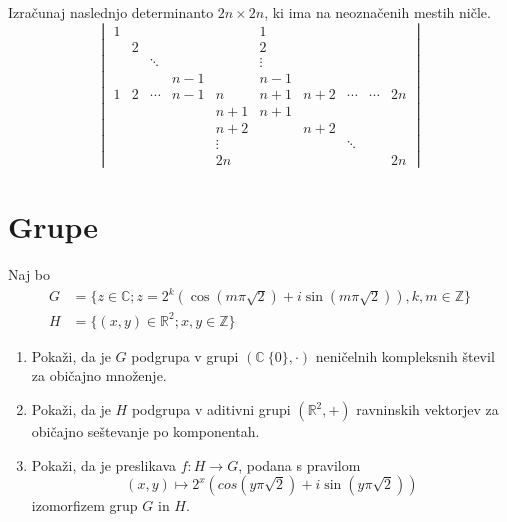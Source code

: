 \documentclass[a4paper,12pt]{article}
\begin{document}
Izračunaj naslednjo determinanto \(2n \times 2n\), ki ima na neoznačenih mestih ničle.
\[
\begin{vmatrix}
1 &   &        &     &     & 1   &     &     &        &    \\
  & 2 &        &     &     & 2   &     &     &        &    \\
  &   & \ddots &     &     & \vdots &  &     &        &    \\
  &   &        & n-1 &     & n-1 &     &     &        &    \\
1 & 2 & \cdots & n-1 & n   & n+1 & n+2 & \cdots & \cdots & 2n \\
  &   &        &     & n+1 & n+1 &     &     &        &    \\
  &   &        &     & n+2 &     & n+2 &     &        &    \\
  &   &        &     & \vdots &  &     & \ddots &     &    \\
  &   &        &     & 2n  &     &     &        &    & 2n
\end{vmatrix}
\]
%
%

\section*{Grupe}

Naj bo
\begin{align*}
    G&=\lbrace z\in \mathbb{C}; z=2^k(\cos(m\pi\sqrt{2})+i\sin(m\pi\sqrt{2})),k,m \in \mathbb{Z}\rbrace \\
    H&= \lbrace (x,y)\in \mathbb{R}^2;x,y \in \mathbb{Z}\rbrace
\end{align*}
\begin{enumerate}
\item
Pokaži, da je \(G\) podgrupa v grupi \((\mathbb{C}\ \lbrace0\rbrace,\cdot)\)
neničelnih kompleksnih števil za običajno množenje.

\item
Pokaži, da je \(H\) podgrupa v aditivni grupi \((\mathbb{R}^2,+)\)
ravninskih vektorjev za običajno seštevanje po komponentah.

\item
Pokaži, da je preslikava \(f:H\to G\), podana s pravilom
\[(x,y)\mapsto 2^x(cos(y\pi\sqrt{2})+i\sin(y\pi\sqrt{2}))\]
izomorfizem grup \(G\) in \(H\).
\end{enumerate}
\end{document}
